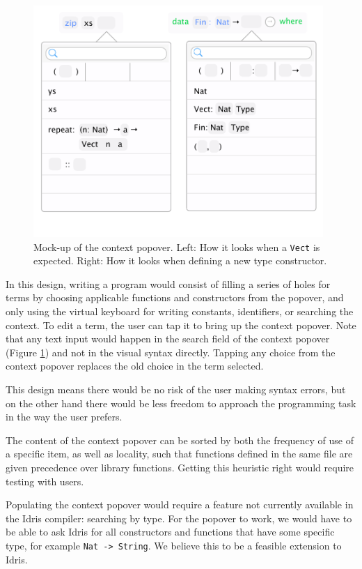 \begin{figure}
	\centering
		\includegraphics[width=110mm]{diagrams/final_design_popover.pdf}
	\caption{Mock-up of the context popover. Left: How it looks when a \texttt{Vect} is
	expected. Right: How it looks when defining a new type constructor.}
\label{fig:new_design_popover}
\end{figure}

In this design, writing a program would consist of filling a series of holes for terms by choosing applicable functions and constructors from the popover, and only using the virtual keyboard for writing constants, identifiers, or searching
the context.
To edit a term, the user can tap it to bring up the context popover. Note that any text input would happen in the search field of the context popover (Figure \ref{fig:new_design_popover}) and
not in the visual syntax directly. Tapping any choice from the context popover replaces the old choice
in the term selected.

This design means there would be no risk of the user making syntax errors, but on the other hand there would be less freedom to approach the programming task in the way the user
prefers.

The content of the context popover can be sorted by both the frequency of use of a specific item, as well as locality, such that functions defined in the same file are given precedence over library functions.
Getting this heuristic right would require testing with users.

Populating the context popover would require a feature not currently available in the Idris compiler: searching by type.
For the popover to work, we would have to be able to ask Idris for all constructors and functions that have some specific type, for example \texttt{Nat -> String}.
We believe this to be a feasible extension to Idris. 

